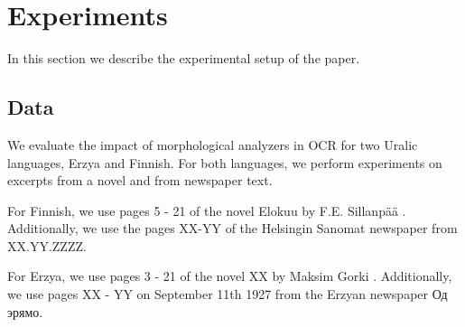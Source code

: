 \documentclass[b5paper]{article}
\begin{document}
\section{Experiments}

%
%
%
%
%
In this section we describe the experimental setup of the paper.

\subsection{Data}
We evaluate the impact of morphological analyzers in OCR for two
Uralic languages, Erzya and Finnish. For both languages, we perform
experiments on excerpts from a novel and from newspaper text.
 
For Finnish, we use pages 5 - 21 of the novel Elokuu by
F.E. Sillanp\"{a}\"{a} \cite{sillanpaa08}. Additionally, we use the
pages XX-YY of the Helsingin Sanomat newspaper from XX.YY.ZZZZ.

For Erzya, we use pages 3 - 21 of the novel XX by Maksim Gorki
\cite{gorki}. Additionally, we use pages XX - YY on September 11th 1927
from the Erzyan newspaper Од эрямо.
\end{document}
